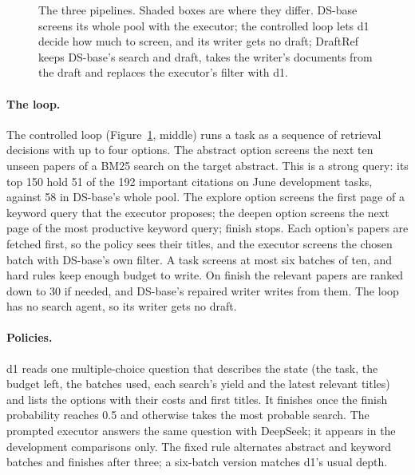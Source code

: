 \documentclass[11pt, letterpaper]{article}
\begin{document}
\begin{figure}[t]
\caption{The three pipelines. Shaded boxes are where they differ. DS-base screens its whole pool with
the executor; the controlled loop lets d1 decide how much to screen, and its writer gets no draft;
DraftRef keeps DS-base's search and draft, takes the writer's documents from the draft and replaces
the executor's filter with d1.}
\label{fig:pipelines}
\end{figure}

\paragraph{The loop.} The controlled loop (Figure~\ref{fig:pipelines}, middle) runs a task as a
sequence of retrieval decisions with up to four options. The abstract option screens the next ten
unseen papers of a BM25 search on the target abstract. This is a strong query: its top 150 hold 51 of
the 192 important citations on June development tasks, against 58 in DS-base's whole pool. The
explore option screens the first page of a keyword query that the executor proposes; the deepen
option screens the next page of the most productive keyword query; finish stops. Each option's
papers are fetched first, so the policy sees their titles, and the executor screens the chosen batch
with DS-base's own filter. A task screens at most six batches of ten, and hard rules keep enough
budget to write. On finish the relevant papers are ranked down to 30 if needed, and DS-base's
repaired writer writes from them. The loop has no search agent, so its writer gets no draft.

\paragraph{Policies.} d1 reads one multiple-choice question that describes the state (the task,
the budget left, the batches used, each search's yield and the latest relevant titles) and lists
the options with their costs and first titles. It finishes once the finish probability reaches 0.5
and otherwise takes the most probable search. The prompted executor answers the same question with
DeepSeek; it appears in the development comparisons only. The fixed rule alternates abstract and
keyword batches and finishes after three; a six-batch version matches d1's usual depth.
\end{document}
